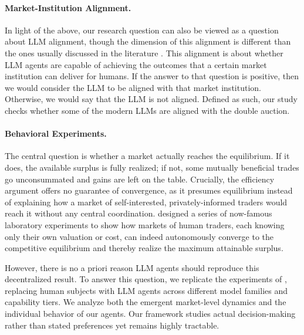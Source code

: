 \documentclass[letterpaper]{article} %
\begin{document}
\paragraph{Market-Institution Alignment.} In light of the above, our research question can also be viewed as a question about LLM alignment, though the dimension of this alignment is different than the ones usually discussed in the literature \cite{ji2025alignmentsurvey}. This alignment is about whether LLM agents are capable of achieving the outcomes that a certain market institution can deliver for humans. If the answer to that question is positive, then we would consider the LLM to be aligned with that market institution. Otherwise, we would say that the LLM is not aligned. Defined as such, our study checks whether some of the modern LLMs are aligned with the double auction.

\paragraph{Behavioral Experiments.} The central question is whether a market actually reaches the equilibrium. If it does, the available surplus is fully realized; if not, some mutually beneficial trades go unconsummated and gains are left on the table. Crucially, the efficiency argument offers no guarantee of convergence, as it presumes equilibrium instead of explaining how a market of self-interested, privately-informed traders would reach it without any central coordination. \citet{smithExperimentalStudyCompetitive1962} designed a series of now-famous laboratory experiments to show how markets of human traders, each knowing only their own valuation or cost, can indeed autonomously converge to the competitive equilibrium and thereby realize the maximum attainable surplus.

However, there is no a priori reason LLM agents should reproduce this decentralized result. To answer this question, we replicate the experiments of \citet{smithExperimentalStudyCompetitive1962}, replacing human subjects with LLM agents across different model families and capability tiers. We analyze both the emergent market-level dynamics and the individual behavior of our agents. Our framework studies actual decision-making rather than stated preferences yet remains highly tractable.
\end{document}
